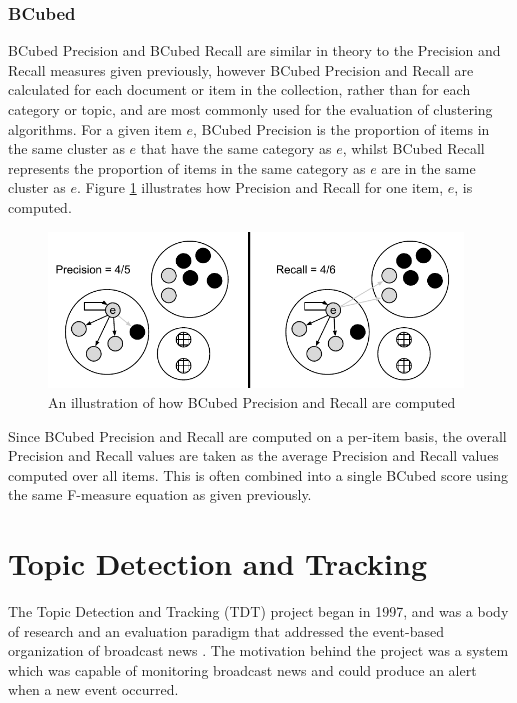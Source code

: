 \subsubsection{BCubed}
\label{background:bcubed}
BCubed Precision and BCubed Recall are similar in theory to the Precision and Recall measures given previously, however BCubed Precision and Recall are calculated for each document or item in the collection, rather than for each category or topic, and are most commonly used for the evaluation of clustering algorithms.
For a given item $e$, BCubed Precision is the proportion of items in the same cluster as $e$ that have the same category as $e$, whilst BCubed Recall represents the proportion of items in the same category as $e$ are in the same cluster as $e$.
Figure \ref{background:graphic:bcubed} illustrates how Precision and Recall for one item, $e$, is computed.

\vspace{0.5cm}
\begin{figure}[h!]
	\centering
	\includegraphics[width=11cm]{Chapters/Background/bcubed.pdf}
	\caption{An illustration of how BCubed Precision and Recall are computed}
	\label{background:graphic:bcubed}
\end{figure}

Since BCubed Precision and Recall are computed on a per-item basis, the overall Precision and Recall values are taken as the average Precision and Recall values computed over all items.
This is often combined into a single BCubed score using the same F-measure equation as given previously.

\section{Topic Detection and Tracking}
The Topic Detection and Tracking (TDT) project began in 1997, and was a body of research and an evaluation paradigm that addressed the event-based organization of broadcast news \citep{Allan:2002:ITD:772260.772262}.
The motivation behind the project was a system which was capable of monitoring broadcast news and could produce an alert when a new event occurred.

